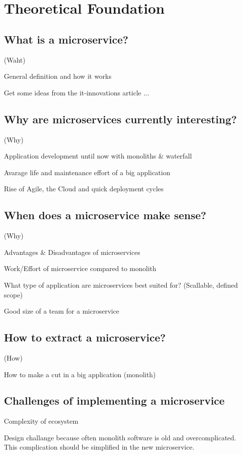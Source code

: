 \chapter{Theoretical Foundation}
\label{sec:found}


\section{What is a microservice?}

(Waht)

General definition and how it works

Get some ideas from the it-innovations article ...


\section{Why are microservices currently interesting?}

(Why)

Application development until now with monoliths \& waterfall

Avarage life and maintenance effort of a big application

Rise of Agile, the Cloud and quick deployment cycles


\section{When does a microservice make sense?}

(Why)

Advantages \& Disadvantages of microservices

Work/Effort of microservice compared to monolith

What type of application are microservices best suited for? (Scallable, defined scope)

Good size of a team for a microservice


\section{How to extract a microservice?}

(How)

How to make a cut in a big application (monolith)


\section{Challenges of implementing a microservice}

Complexity of ecosystem

Design challange because often monolith software is old and overcomplicated. This complication should be simplified in the new microservice.
